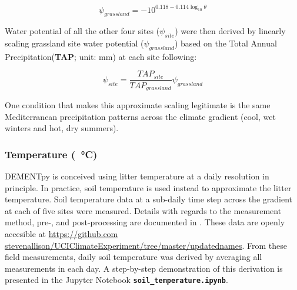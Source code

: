 \documentclass[letterpaper, 10pt]{article}
\begin{document}
\begin{equation}
  \psi_{grassland} = -10^{0.118-0.114\log_{10} \theta}
\end{equation}

Water potential of all the other four sites ($\psi_{site}$) were then derived by linearly scaling grassland site water
potential ($\psi_{grassland}$) based on the Total Annual Precipitation(\textbf{TAP}; unit: mm) at each site following:

\begin{equation}
  \psi_{site} = \frac{TAP_{site}}{TAP_{grassland}} \psi_{grassland}
\end{equation}

One condition that makes this approximate scaling legitimate is the same Mediterranean precipitation patterns
across the climate gradient (cool, wet winters and hot, dry summers).


\subsubsection{Temperature (\SI{}{\celsius})}
DEMENTpy is conceived using litter temperature at a daily resolution in principle. In practice, soil temperature is
used instead to approximate the litter temperature. Soil temperature data at a sub-daily time step across the gradient
at each of five sites were measured. Details with regards to the measurement method, pre-, and post-processing are
documented in \citet{glassman2018decomposition}. These data are openly accesible at \url{https://github.com
stevenallison/UCIClimateExperiment/tree/master/updatednames}. From these field measurements, daily soil
temperature was derived by averaging all measurements in each day. A step-by-step demonstration of this derivation
is presented in the Jupyter Notebook \textbf{\texttt{soil\_temperature.ipynb}}.
\end{document}
